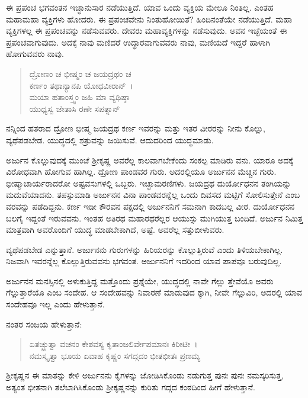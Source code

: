 ಈ ಪ್ರಪಂಚ ಭಗವಂತನ ಇಚ್ಛಾನುಸಾರ ನಡೆಯುತ್ತಿದೆ. ಯಾವ ಒಂದು ವ್ಯಕ್ತಿಯ ಮೇಲೂ ನಿಂತಿಲ್ಲ. ಎಂತಹ ಮಹಾಮಹಾ ವ್ಯಕ್ತಿಗಳು ಹೋದರು. ಈ ಪ್ರಪಂಚವೇನು ನಿಂತುಹೋಯಿತೆ? ಹಿಂದಿನಂತೆಯೇ ನಡೆಯುತ್ತಿದೆ. ಮಹಾ ವ್ಯಕ್ತಿಗಳಲ್ಲ ಈ ಪ್ರಪಂಚವನ್ನು ನಡೆಸುವವರು. ದೇವರು ಮಹಾವ್ಯಕ್ತಿಗಳನ್ನು ನಡೆಸುವುದು. ಅವನ ಇಚ್ಛೆಯಂತೆ ಈ ಪ್ರಪಂಚವಾಗುವುದು. ಅದಕ್ಕೆ ನಾವು ಮಣಿದರೆ ಉದ್ಧಾರವಾಗುವವರು ನಾವು, ಮಣಿಯದೆ ಇದ್ದರೆ ಹಾಳಾಗಿ ಹೋಗುವವರು ನಾವು.

\begin{verse}
ದ್ರೋಣಂ ಚ ಭೀಷ್ಮಂ ಚ ಜಯದ್ರಥಂ ಚ \\ ಕರ್ಣಂ ತಥಾನ್ಯಾನಪಿ ಯೋಧವೀರಾನ್~।\\ಮಯಾ ಹತಾಂಸ್ತ್ವಂ ಜಹಿ ಮಾ ವ್ಯಥಿಷ್ಠಾ \\ ಯುಧ್ಯಸ್ವ ಜೇತಾಸಿ ರಣೇ ಸಪತ್ನಾನ್ 
\end{verse}

{\small ನನ್ನಿಂದ ಹತರಾದ ದ್ರೋಣ ಭೀಷ್ಮ ಜಯದ್ರಥ ಕರ್ಣ ಇವರನ್ನು ಮತ್ತು ಇತರ ವೀರರನ್ನು ನೀನು ಕೊಲ್ಲು, ವ್ಯಥೆಪಡಬೇಡ. ಯುದ್ಧದಲ್ಲಿ ಶತ್ರುವನ್ನು ಜಯಿಸುವೆ. ಆದುದರಿಂದ ಯುದ್ಧಮಾಡು.}

ಅರ್ಜುನ ಕೊಲ್ಲುವುದಕ್ಕೆ ಮುಂಚೆ ಶ‍್ರೀಕೃಷ್ಣ ಅವರೆಲ್ಲ ಕಾಲವಾಗಬೇಕೆಂದು ಸಂಕಲ್ಪ ಮಾಡಿರು ವನು. ಯಾರೂ ಅದಕ್ಕೆ ವಿರೋಧವಾಗಿ ಹೋಗುವ ಹಾಗಿಲ್ಲ. ದ್ರೋಣ ಪಾಂಡವರ ಗುರು. ಅದರಲ್ಲಿಯೂ ಅರ್ಜುನನ ಮೆಚ್ಚಿನ ಗುರು. ಭೀಷ್ಮಾಚಾರ್ಯರಾದರೋ ಅಷ್ಟವಸುಗಳಲ್ಲಿ ಒಬ್ಬರು. ಇಚ್ಛಾಮರಣಿಗಳು. ಜಯದ್ರಥ ದುರ್ಯೋಧನನ ತಂಗಿಯನ್ನು ಮದುವೆಯಾದನು. ತಪಸ್ಸುಮಾಡಿ ಅರ್ಜುನನ ವಿನಾ ಪಾಂಡವರನ್ನೆಲ್ಲ ಒಂದು ದಿವಸದ ಮಟ್ಟಿಗೆ ಸೋಲಿಸುತ್ತೇನೆ ಎಂಬ ವರವನ್ನು ಪಡೆದಿದ್ದನು. ಕರ್ಣ ಇಡೀ ಕೌರವನ ಪಕ್ಷದಲ್ಲಿ ಅರ್ಜುನನಿಗೆ ಸಮನಾಗಿ ಕಾದಬಲ್ಲ ವೀರ. ದುರ್ಯೋಧನನ ಬಲಗೈ ಇದ್ದಂತೆ ಇರುವವನು. ಇಂತಹ ಅತಿರಥ ಮಹಾರಥರೆಲ್ಲರ ಆಯುಸ್ಸು ಮುಗಿಯುತ್ತ ಬಂದಿದೆ. ಅರ್ಜುನ ನಿಮಿತ್ತ ಮಾತ್ರವಾಗಿ ಅವರೊಂದಿಗೆ ಯುದ್ಧ ಮಾಡಬೇಕಾಗಿದೆ, ಅಷ್ಟೆ. ಅವರೆಲ್ಲ ಸತ್ತುಬೀಳುವರು.

ವ್ಯಥೆಪಡಬೇಡ ಎನ್ನುತ್ತಾನೆ. ಅರ್ಜುನನು ಗುರುಗಳನ್ನು ಹಿರಿಯರನ್ನು ಕೊಲ್ಲುತ್ತಿರುವೆ ಎಂದು ತಿಳಿಯಬೇಕಾಗಿಲ್ಲ. ನಿಜವಾಗಿ ಇವರನ್ನೆಲ್ಲ ಕೊಲ್ಲುತ್ತಿರುವವನು ಭಗವಂತ. ಅರ್ಜುನನಿಗೆ ಇದರಿಂದ ಯಾವ ಪಾಪವೂ ಬರುವುದಿಲ್ಲ.

ಅರ್ಜುನನ ಮನಸ್ಸಿನಲ್ಲಿ ಅಳುಕುತ್ತಿದ್ದ ಮತ್ತೊಂದು ಪ್ರಶ್ನೆಯೇ, ಯುದ್ಧದಲ್ಲಿ ನಾವೇ ಗೆಲ್ಲು ತ್ತೇವೆಯೊ ಅವರು ಗೆಲ್ಲುತ್ತಾರೆಯೊ ಎಂಬ ಸಂದೇಹ. ಆ ಸಂದೇಹವನ್ನು ನಿವಾರಣೆ ಮಾಡುವುದ ಕ್ಕಾಗಿ, ನೀವೇ ಗೆಲ್ಲುವಿರಿ, ಅದರಲ್ಲಿ ಯಾವ ಸಂದೇಹವೂ ಇಲ್ಲ ಎಂದು ಹೇಳುತ್ತಾನೆ.

ನಂತರ ಸಂಜಯ ಹೇಳುತ್ತಾನೆ:

\begin{verse}
ಏತಚ್ಛ್ರುತ್ವಾ ವಚನಂ ಕೇಶವಸ್ಯ ಕೃತಾಂಜಲಿರ್ವೇಪಮಾನಃ ಕಿರೀಟೀ~।\\ನಮಸ್ಕೃತ್ವಾ ಭೂಯ ಏವಾಹ ಕೃಷ್ಣಂ ಸಗದ್ಗದಂ ಭೀತಭೀತಃ ಪ್ರಣಮ್ಯ 
\end{verse}

{\small ಶ‍್ರೀಕೃಷ್ಣನ ಈ ಮಾತನ್ನು ಕೇಳಿ ಅರ್ಜುನನು ಕೈಗಳನ್ನು ಜೋಡಿಸಿಕೊಂಡು ನಡುಗುತ್ತ ಪುನಃ ಪುನಃ ನಮಸ್ಕರಿಸುತ್ತ, ಅತ್ಯಂತ ಭೀತನಾಗಿ ತಲೆಬಾಗಿಸಿಕೊಂಡು ಶ‍್ರೀಕೃಷ್ಣನನ್ನು ಕುರಿತು ಗದ್ಗದ ಕಂಠದಿಂದ ಹೀಗೆ ಹೇಳುತ್ತಾನೆ.}

